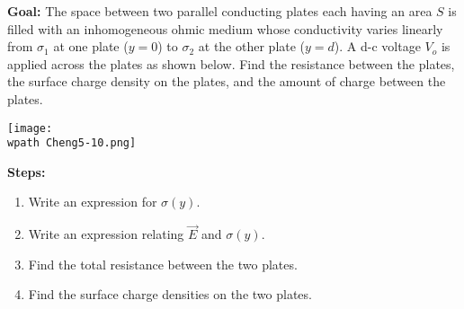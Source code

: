 \documentclass[../../header.tex]{subfiles}
\begin{document}
\textbf{Goal:} The space between two parallel conducting plates each having an area $S$ is filled with an inhomogeneous ohmic medium whose conductivity varies linearly from $\sigma_1$ at one plate ($y=0$) to $\sigma_2$ at the other plate ($y=d$). A d-c voltage $V_o$ is applied across the plates as shown below. Find the resistance between the plates, the surface charge density on the plates, and the amount of charge between the plates.
\begin{center}
\texttt{[image: \\wpath Cheng5-10.png]}
\end{center}
\textbf{Steps:} 
\begin{enumerate}
\item Write an expression for $\sigma(y)$.\\

\item Write an expression relating $\vec{E}$ and $\sigma(y)$.\\

\item Find the total resistance between the two plates.\\

\item Find the surface charge densities on the two plates.\\


\end{enumerate}
\end{document}
